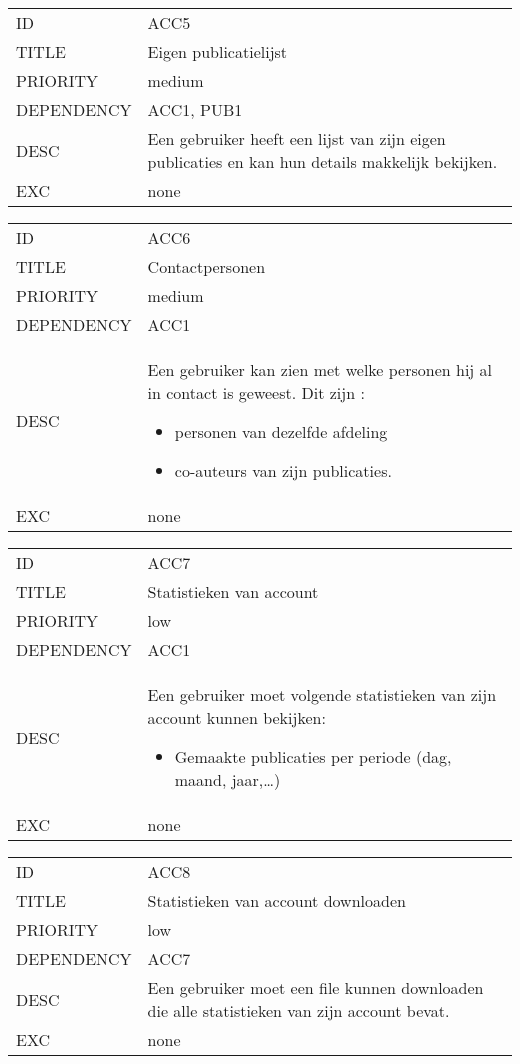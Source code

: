 \begin{longtable}{lp{10cm}}
ID           & ACC5\\
TITLE        & Eigen publicatielijst\\
PRIORITY     & medium\\
DEPENDENCY   & ACC1, PUB1\\
DESC         & Een gebruiker heeft een lijst van zijn eigen publicaties en kan hun details makkelijk bekijken.\\
EXC          & none
\end{longtable}

\begin{longtable}{lp{10cm}}
ID           & ACC6\\
TITLE        & Contactpersonen\\
PRIORITY     & medium\\
DEPENDENCY   & ACC1\\
DESC         & Een gebruiker kan zien met welke personen hij al in contact is geweest.
Dit zijn :
\begin{itemize}
\item personen van dezelfde afdeling
\item co-auteurs van zijn publicaties.
\end{itemize}\\
EXC          & none    
\end{longtable}

\begin{longtable}{lp{10cm}}
ID           & ACC7\\
TITLE        & Statistieken van account\\
PRIORITY     & low\\
DEPENDENCY   & ACC1\\
DESC         & Een gebruiker moet volgende statistieken van zijn account kunnen bekijken:
\begin{itemize}
\item Gemaakte publicaties per periode (dag, maand, jaar,\ldots)
\end{itemize}\\
EXC          & none
\end{longtable}

\begin{longtable}{lp{10cm}}
ID           & ACC8\\
TITLE        & Statistieken van account downloaden\\
PRIORITY     & low\\
DEPENDENCY   & ACC7\\
DESC         & Een gebruiker moet een file kunnen downloaden die alle statistieken van zijn account bevat.\\
EXC          & none
\end{longtable}

